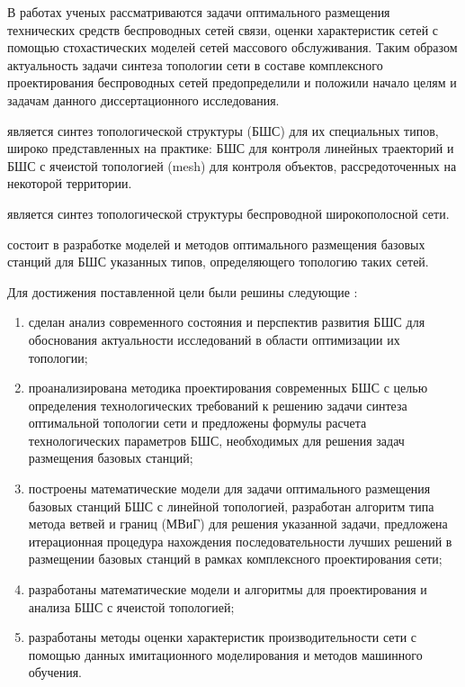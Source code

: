 В работах ученых рассматриваются задачи оптимального размещения технических средств беспроводных сетей связи, оценки характеристик сетей с помощью стохастических моделей сетей массового обслуживания. Таким образом актуальность задачи синтеза топологии сети в составе комплексного проектирования беспроводных сетей предопределили и положили начало целям и задачам данного диссертационного исследования. 


{\objectresearch} является синтез топологической структуры (БШС) для их специальных типов, широко представленных на практике: БШС для контроля линейных траекторий и БШС с ячеистой топологией (mesh) для контроля объектов, рассредоточенных на некоторой территории.

{\subjectresearch} является синтез топологической структуры беспроводной широкополосной сети.

{\aim} состоит в разработке моделей и методов оптимального размещения базовых станций для БШС указанных типов, определяющего топологию таких сетей.

Для достижения поставленной цели были решины следующие {\tasks}:
\begin{enumerate}[beginpenalty=10000] %
  \item сделан анализ современного состояния и перспектив развития БШС для  обоснования  актуальности исследований в области оптимизации их топологии; 
  \item проанализирована методика проектирования современных БШС с целью определения технологических требований к решению задачи синтеза оптимальной топологии сети и предложены формулы расчета технологических параметров БШС, необходимых для решения задач размещения базовых станций;
  \item построены математические модели для задачи оптимального размещения базовых станций БШС с линейной топологией, разработан алгоритм типа метода ветвей и границ (МВиГ) для решения указанной задачи, предложена итерационная процедура нахождения последовательности лучших решений в размещении базовых станций в рамках комплексного проектирования сети;
  \item разработаны математические модели и алгоритмы для проектирования и анализа БШС с ячеистой топологией;
  \item разработаны методы оценки характеристик производительности сети с помощью данных имитационного моделирования и методов машинного обучения. 
\end{enumerate}



